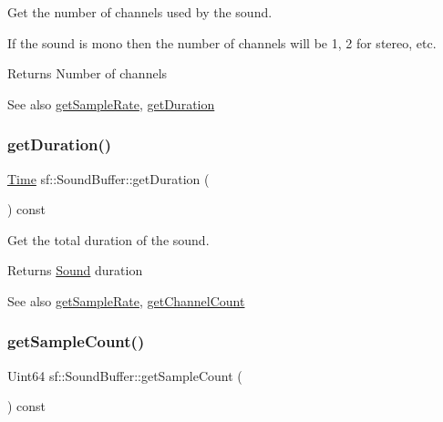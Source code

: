 Get the number of channels used by the sound. 

If the sound is mono then the number of channels will be 1, 2 for stereo, etc.

\begin{DoxyReturn}{Returns}
Number of channels
\end{DoxyReturn}
\begin{DoxySeeAlso}{See also}
\hyperlink{classsf_1_1_sound_buffer_a2c2cf0078ce0549246ecc4a1646212b4}{get\+Sample\+Rate}, \hyperlink{classsf_1_1_sound_buffer_a280a581d9b360fd16121714c51fc8261}{get\+Duration} 
\end{DoxySeeAlso}
\mbox{\label{classsf_1_1_sound_buffer_a280a581d9b360fd16121714c51fc8261}} 
\subsubsection{\texorpdfstring{get\+Duration()}{getDuration()}}
{\footnotesize\ttfamily \hyperlink{classsf_1_1_time}{Time} sf\+::\+Sound\+Buffer\+::get\+Duration (\begin{DoxyParamCaption}{ }\end{DoxyParamCaption}) const}



Get the total duration of the sound. 

\begin{DoxyReturn}{Returns}
\hyperlink{classsf_1_1_sound}{Sound} duration
\end{DoxyReturn}
\begin{DoxySeeAlso}{See also}
\hyperlink{classsf_1_1_sound_buffer_a2c2cf0078ce0549246ecc4a1646212b4}{get\+Sample\+Rate}, \hyperlink{classsf_1_1_sound_buffer_a127707b831d875ed790eef1aa2b9fcc3}{get\+Channel\+Count} 
\end{DoxySeeAlso}
\mbox{\label{classsf_1_1_sound_buffer_aebe2a4bdbfbd9249353748da3f6a4fa1}} 
\subsubsection{\texorpdfstring{get\+Sample\+Count()}{getSampleCount()}}
{\footnotesize\ttfamily Uint64 sf\+::\+Sound\+Buffer\+::get\+Sample\+Count (\begin{DoxyParamCaption}{ }\end{DoxyParamCaption}) const}



